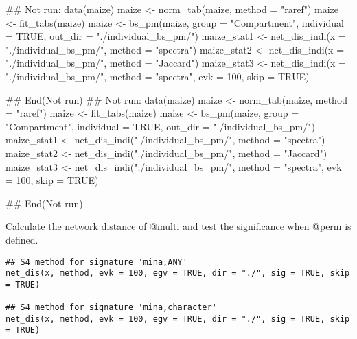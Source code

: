 \documentclass[a4paper]{book}
\begin{document}
%
\begin{Examples}
\begin{ExampleCode}
## Not run: 
data(maize)
maize <- norm_tab(maize, method = "raref")
maize <- fit_tabs(maize)
maize <- bs_pm(maize, group = "Compartment", individual = TRUE, out_dir =
"./individual_bs_pm/")
maize_stat1 <- net_dis_indi(x = "./individual_bs_pm/", method = "spectra")
maize_stat2 <- net_dis_indi(x = "./individual_bs_pm/", method = "Jaccard")
maize_stat3 <- net_dis_indi(x = "./individual_bs_pm/", method = "spectra",
evk = 100, skip = TRUE)

## End(Not run)
## Not run: 
data(maize)
maize <- norm_tab(maize, method = "raref")
maize <- fit_tabs(maize)
maize <- bs_pm(maize, group = "Compartment", individual = TRUE, out_dir =
"./individual_bs_pm/")
maize_stat1 <- net_dis_indi("./individual_bs_pm/", method = "spectra")
maize_stat2 <- net_dis_indi("./individual_bs_pm/", method = "Jaccard")
maize_stat3 <- net_dis_indi("./individual_bs_pm/", method = "spectra",
evk = 100, skip = TRUE)

## End(Not run)
\end{ExampleCode}
\end{Examples}
%
\begin{Description}\relax
Calculate the network distance of @multi and test the significance when @perm
is defined.
\end{Description}
%
\begin{Usage}
\begin{verbatim}
## S4 method for signature 'mina,ANY'
net_dis(x, method, evk = 100, egv = TRUE, dir = "./", sig = TRUE, skip = TRUE)

## S4 method for signature 'mina,character'
net_dis(x, method, evk = 100, egv = TRUE, dir = "./", sig = TRUE, skip = TRUE)
\end{verbatim}
\end{Usage}
%
\end{document}
